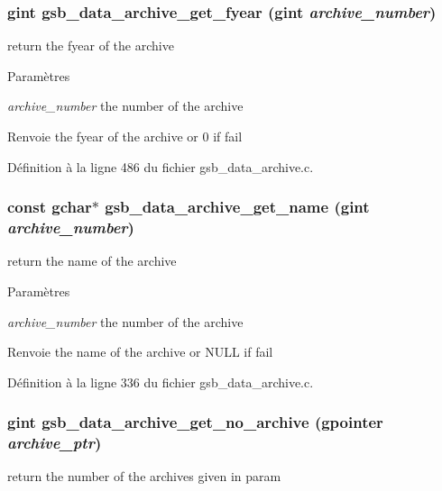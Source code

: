 \subsubsection[{gsb\_\-data\_\-archive\_\-get\_\-fyear}]{\setlength{\rightskip}{0pt plus 5cm}gint gsb\_\-data\_\-archive\_\-get\_\-fyear (gint {\em archive\_\-number})}\label{gsb__data__archive_8c_a7155599a42559d8b97aa24f6c89c3684}
return the fyear of the archive


\begin{DoxyParams}{Paramètres}
\item[{\em archive\_\-number}]the number of the archive\end{DoxyParams}
\begin{DoxyReturn}{Renvoie}
the fyear of the archive or 0 if fail 
\end{DoxyReturn}


Définition à la ligne 486 du fichier gsb\_\-data\_\-archive.c.

\subsubsection[{gsb\_\-data\_\-archive\_\-get\_\-name}]{\setlength{\rightskip}{0pt plus 5cm}const gchar$\ast$ gsb\_\-data\_\-archive\_\-get\_\-name (gint {\em archive\_\-number})}\label{gsb__data__archive_8c_ab61c1a7e1814ae6b8d5fd6f54db3606b}
return the name of the archive


\begin{DoxyParams}{Paramètres}
\item[{\em archive\_\-number}]the number of the archive\end{DoxyParams}
\begin{DoxyReturn}{Renvoie}
the name of the archive or NULL if fail 
\end{DoxyReturn}


Définition à la ligne 336 du fichier gsb\_\-data\_\-archive.c.

\subsubsection[{gsb\_\-data\_\-archive\_\-get\_\-no\_\-archive}]{\setlength{\rightskip}{0pt plus 5cm}gint gsb\_\-data\_\-archive\_\-get\_\-no\_\-archive (gpointer {\em archive\_\-ptr})}\label{gsb__data__archive_8c_a4d89b738aff63b952bd74a74c9e4bdff}
return the number of the archives given in param


